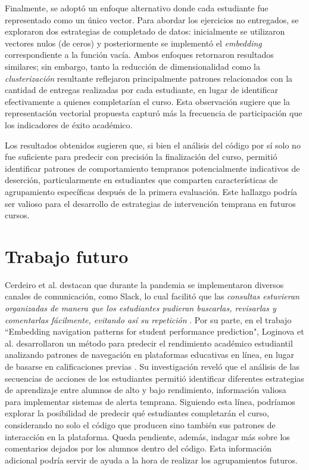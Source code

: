 \documentclass[11pt,a4paper,twoside,openany]{tesis}
\begin{document}
Finalmente, se adoptó un enfoque alternativo donde cada estudiante fue representado como un único vector. Para abordar los ejercicios no entregados, se exploraron dos estrategias de completado de datos: inicialmente se utilizaron vectores nulos (de ceros) y posteriormente se implementó el \emph{embedding} correspondiente a la función vacía. Ambos enfoques retornaron resultados similares; sin embargo, tanto la reducción de dimensionalidad como la \emph{clusterización} resultante reflejaron principalmente patrones relacionados con la cantidad de entregas realizadas por cada estudiante, en lugar de identificar efectivamente a quienes completarían el curso. Esta observación sugiere que la representación vectorial propuesta capturó más la frecuencia de participación que los indicadores de éxito académico.

Los resultados obtenidos sugieren que, si bien el análisis del código por sí solo no fue suficiente para predecir con precisión la finalización del curso, permitió identificar patrones de comportamiento tempranos potencialmente indicativos de deserción, particularmente en estudiantes que comparten características de agrupamiento específicas después de la primera evaluación. Este hallazgo podría ser valioso para el desarrollo de estrategias de intervención temprana en futuros cursos.

\chapter{Trabajo futuro }

Cerdeiro et al. destacan que durante la pandemia se implementaron diversos canales de comunicación, como Slack, lo cual facilitó que las \emph{consultas estuvieran organizadas de manera que los estudiantes pudieran buscarlas, revisarlas y comentarlas fácilmente, evitando así su repetición} \cite{unsam2020}. Por su parte, en el trabajo ``Embedding navigation patterns for student performance prediction", Loginova et al. desarrollaron un método para predecir el rendimiento académico estudiantil analizando patrones de navegación en plataformas educativas en línea, en lugar de basarse en calificaciones previas \cite{loginova2021embedding}. Su investigación reveló que el análisis de las secuencias de acciones de los estudiantes permitió identificar diferentes estrategias de aprendizaje entre alumnos de alto y bajo rendimiento, información valiosa para implementar sistemas de alerta temprana. Siguiendo esta línea, podríamos explorar la posibilidad de predecir qué estudiantes completarán el curso, considerando no solo el código que producen sino también sus patrones de interacción en la plataforma. Queda pendiente, además, indagar más sobre los comentarios dejados por los alumnos dentro del código. Esta información adicional podría servir de ayuda a la hora de realizar los agrupamientos futuros.
\end{document}
